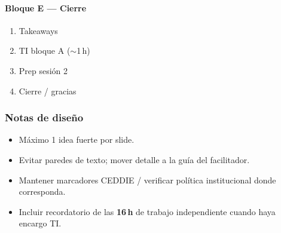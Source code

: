 \paragraph{Bloque E --- Cierre}\begin{enumerate}
\item Takeaways
\item TI bloque A ($\sim$1\,h)
\item Prep sesión 2
\item Cierre / gracias
\end{enumerate}

\subsubsection*{Notas de diseño}
\begin{itemize}
\item Máximo 1 idea fuerte por slide.
\item Evitar paredes de texto; mover detalle a la guía del facilitador.
\item Mantener marcadores CEDDIE / verificar política institucional donde corresponda.
\item Incluir recordatorio de las \textbf{16\,h} de trabajo independiente cuando haya encargo TI.
\end{itemize}
